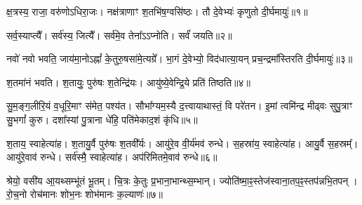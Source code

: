 
क्ष॒त्रस्य॒ राजा॒ वरु॑णोऽधिरा॒जः। नक्ष॑त्राणाꣳ श॒तभि॑ष॒ग्वसि॑ष्ठः। तौ दे॒वेभ्यः॑ कृणुतो दी॒र्घमायुः॑॥१॥

सर्व॒स्याप्त्यै᳚। सर्व॑स्य॒ जित्यै᳚। सर्व॑मे॒व तेना᳚ऽऽप्नोति। सर्वं॑ जयति॥२॥

नवो॑ नवो भवति॒ जाय॑मा॒नोऽह्नां᳚ के॒तुरु॒षसा॑मे॒त्यग्रे᳚।
भा॒गं दे॒वेभ्यो॒ विद॑धात्या॒यन् प्रच॒न्द्रमा᳚स्तिरति दी॒र्घमायुः॑॥३॥

श॒तमा॑नं भवति। श॒तायुः॒ पुरु॑षः श॒तेन्द्रि॑यः। आयु॑ष्ये॒वेन्द्रि॒ये प्रति॑ तिष्ठति॥४॥

सु॒म॒ङ्ग॒लीरि॒यं व॒धूरि॒माꣳ स॑मेत॒ पश्य॑त। 
सौभा᳚ग्यम॒स्यै द॒त्त्वायाथास्तं॒ वि परे॑तन। 
इ॒मां त्वमि॑न्द्र मीढ्वः सुपु॒त्राꣳ सु॒भगां᳚ कुरु। 
दशा᳚स्यां पु॒त्राना धे॑हि॒ पति॑मेकाद॒शं कृ॑धि॥५॥ 


श॒ताय॒ स्वाहेत्या॑ह। श॒तायु॒र्वै पुरु॑षः श॒तवी᳚र्यः। आयु॑रे॒व वी॒र्य॑मव॑ रुन्धे। स॒हस्रा॑य॒ स्वाहेत्या॑ह। आयु॒र्वै स॒हस्रम्᳚। आयु॑रे॒वाव॑ रुन्धे। सर्व॑स्मै॒ स्वाहेत्या॑ह। अप॑रिमितमे॒वाव॑ रुन्धे॥६॥


श्रेयो॒ वसी॑य आ॒यथ्सम्भू॑तं भू॒तम्। 
चि॒त्रः के॒तुः प्र॒भाना॒भान्थ्स॒म्भान्। 
ज्योति॑ष्मा॒ꣴ॒स्तेज॑स्वाना॒तप॒ꣴ॒स्तप॑न्नभि॒\-तपन्। 
रो॒च॒नो रोच॑मानः शोभ॒नः शोभ॑मानः क॒ल्याणः॑॥७॥

